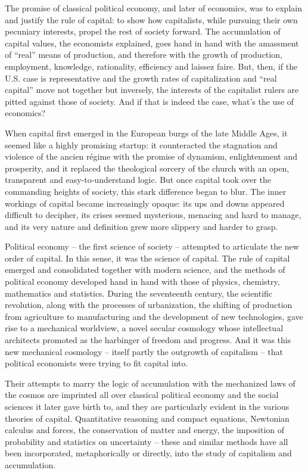 \documentclass[
]{book}
\begin{document}
The promise of classical political economy, and later of economics, was to explain and justify the rule of capital: to show how capitalists, while pursuing their own pecuniary interests, propel the rest of society forward. The accumulation of capital values, the economists explained, goes hand in hand with the amassment of ``real'' means of production, and therefore with the growth of production, employment, knowledge, rationality, efficiency and laissez faire. But, then, if the U.S. case is representative and the growth rates of capitalization and ``real capital'' move not together but inversely, the interests of the capitalist rulers are pitted against those of society. And if that is indeed the case, what's the use of economics?

When capital first emerged in the European burgs of the late Middle Ages, it seemed like a highly promising startup: it counteracted the stagnation and violence of the ancien régime with the promise of dynamism, enlightenment and prosperity, and it replaced the theological sorcery of the church with an open, transparent and easy-to-understand logic. But once capital took over the commanding heights of society, this stark difference began to blur. The inner workings of capital became increasingly opaque: its ups and downs appeared difficult to decipher, its crises seemed mysterious, menacing and hard to manage, and its very nature and definition grew more slippery and harder to grasp.

Political economy -- the first science of society -- attempted to articulate the new order of capital. In this sense, it was the science of capital. The rule of capital emerged and consolidated together with modern science, and the methods of political economy developed hand in hand with those of physics, chemistry, mathematics and statistics. During the seventeenth century, the scientific revolution, along with the processes of urbanization, the shifting of production from agriculture to manufacturing and the development of new technologies, gave rise to a mechanical worldview, a novel secular cosmology whose intellectual architects promoted as the harbinger of freedom and progress. And it was this new mechanical cosmology -- itself partly the outgrowth of capitalism -- that political economists were trying to fit capital into.

Their attempts to marry the logic of accumulation with the mechanized laws of the cosmos are imprinted all over classical political economy and the social sciences it later gave birth to, and they are particularly evident in the various theories of capital. Quantitative reasoning and compact equations, Newtonian calculus and forces, the conservation of matter and energy, the imposition of probability and statistics on uncertainty -- these and similar methods have all been incorporated, metaphorically or directly, into the study of capitalism and accumulation.
\end{document}
